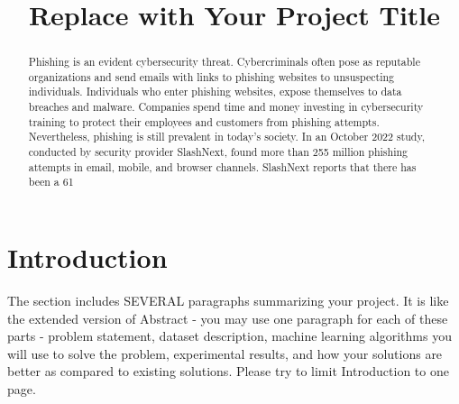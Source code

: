 \documentclass[conference]{IEEEtran}
\begin{document}
\title{Replace with Your Project Title}

\author{
\and
{}
\and
{}
}

\maketitle


\begin{abstract}
Phishing is an evident cybersecurity threat. Cybercriminals often pose as reputable organizations and send emails with links to phishing websites to unsuspecting individuals. Individuals who enter phishing websites, expose themselves to data breaches and malware. Companies spend time and money investing in cybersecurity training to protect their employees and customers from phishing attempts. Nevertheless, phishing is still prevalent in today’s society. In an October 2022 study, conducted by security provider SlashNext, found more than 255 million phishing attempts in email, mobile, and browser channels. SlashNext reports that there has been a 61%
\end{abstract}

\section{Introduction}
The section includes SEVERAL paragraphs summarizing your project. It is like the extended version of Abstract - you may use one paragraph for each of these parts - problem statement, dataset description, machine learning algorithms you will use to solve the problem, experimental results, and how your solutions are better as compared to existing solutions. Please try to limit Introduction to one page.
\end{document}
